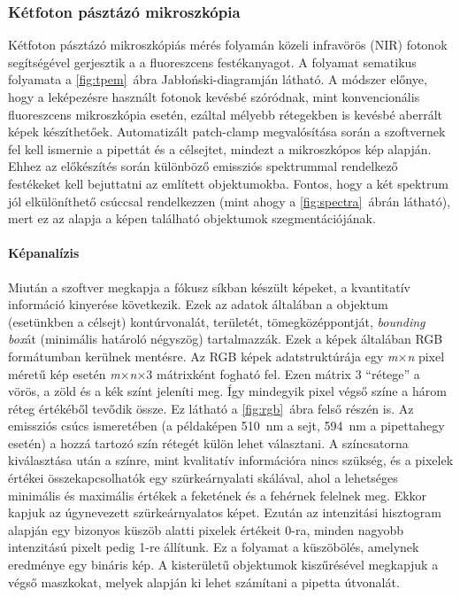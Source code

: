 \documentclass[12pt,a4paper]{report}
\begin{document}
\subsubsection*{Kétfoton pásztázó mikroszkópia}
Kétfoton pásztázó mikroszkópiás mérés folyamán közeli infravörös (NIR) fotonok segítségével gerjesztik a a fluoreszcens festékanyagot. A folyamat sematikus folyamata a \ref{fig:tpem}~ábra Jabłoński-diagramján látható. A módszer előnye, hogy a leképezésre használt fotonok kevésbé szóródnak, mint konvencionális fluoreszcens mikroszkópia esetén, ezáltal mélyebb rétegekben is kevésbé aberrált képek készíthetőek. Automatizált patch-clamp megvalósítása során a szoftvernek fel kell ismernie a pipettát és a célsejtet, mindezt a mikroszkópos kép alapján. Ehhez az előkészítés során különböző emissziós spektrummal rendelkező festékeket kell bejuttatni az említett objektumokba. Fontos, hogy a két spektrum jól elkülöníthető csúccsal rendelkezzen (mint ahogy a \ref{fig:spectra}~ábrán látható), mert ez az alapja a képen található objektumok szegmentációjának.

\paragraph*{Képanalízis}
Miután a szoftver megkapja a fókusz síkban készült képeket, a kvantitatív információ kinyerése következik. Ezek az adatok általában a objektum (esetünkben a célsejt) kontúrvonalát, területét, tömegközéppontját, \textit{bounding box}át (minimális határoló négyszög) tartalmazzák. Ezek a képek általában RGB formátumban kerülnek mentésre. Az RGB képek adatstruktúrája egy \textit{m}×\textit{n} pixel méretű kép esetén \textit{m}×\textit{n}×3 mátrixként fogható fel. Ezen mátrix 3 \enquote{rétege} a vörös, a zöld és a kék színt jeleníti meg. Így mindegyik pixel végső színe a három réteg értékéből tevődik össze. Ez látható a \ref{fig:rgb}~ábra felső részén is. Az emissziós csúcs ismeretében (a példaképen 510~nm a sejt, 594~nm a pipettahegy esetén) a hozzá tartozó szín rétegét külön lehet választani. A színcsatorna kiválasztása után a színre, mint kvalitatív információra nincs szükség, és a pixelek értékei összekapcsolhatók egy szürkeárnyalati skálával, ahol a lehetséges minimális és maximális értékek a feketének és a fehérnek felelnek meg. Ekkor kapjuk az úgynevezett szürkeárnyalatos képet. Ezután az intenzitási hisztogram alapján egy bizonyos küszöb alatti pixelek értékeit 0-ra, minden nagyobb intenzitású pixelt pedig 1-re állítunk. Ez a folyamat a küszöbölés, amelynek eredménye egy bináris kép. A kisterületű objektumok kiszűrésével megkapjuk a végső maszkokat, melyek alapján ki lehet számítani a pipetta útvonalát.
\end{document}
